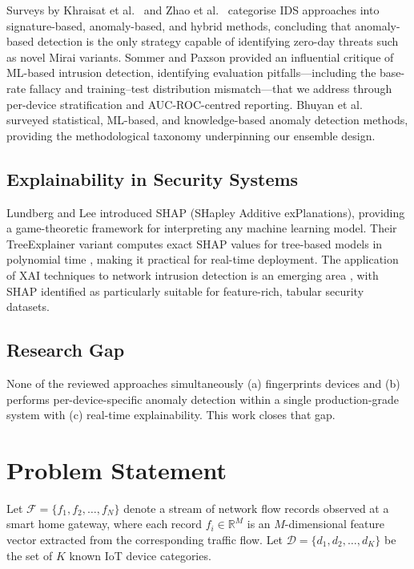 \documentclass[conference]{IEEEtran}
\begin{document}
Surveys by Khraisat et al.\ \cite{khraisat2019survey} and Zhao et al.\
\cite{zhao2021survey} categorise IDS approaches into signature-based,
anomaly-based, and hybrid methods, concluding that anomaly-based detection
is the only strategy capable of identifying zero-day threats such as novel
Mirai variants. Sommer and Paxson \cite{sommer2010outside} provided an
influential critique of ML-based intrusion detection, identifying
evaluation pitfalls---including the base-rate fallacy and
training--test distribution mismatch---that we address through per-device
stratification and AUC-ROC-centred reporting. Bhuyan et al.\
\cite{bhuyan2014network} surveyed statistical, ML-based, and
knowledge-based anomaly detection methods, providing the methodological
taxonomy underpinning our ensemble design.

\subsection{Explainability in Security Systems}

Lundberg and Lee \cite{lundberg2017unified} introduced SHAP (SHapley Additive
exPlanations), providing a game-theoretic framework for interpreting any
machine learning model. Their TreeExplainer variant computes exact SHAP
values for tree-based models in polynomial time \cite{lundberg2020local},
making it practical for real-time deployment. The application of XAI
techniques to network intrusion detection is an emerging area
\cite{ge2023deep}, with SHAP identified as particularly suitable for
feature-rich, tabular security datasets.

\subsection{Research Gap}

None of the reviewed approaches simultaneously (a) fingerprints devices and
(b) performs per-device-specific anomaly detection within a single
production-grade system with (c) real-time explainability. This work closes
that gap.

\section{Problem Statement}
\label{sec:problem}

Let $\mathcal{F} = \{f_1, f_2, \ldots, f_N\}$ denote a stream of network
flow records observed at a smart home gateway, where each record
$f_i \in \mathbb{R}^M$ is an $M$-dimensional feature vector extracted from
the corresponding traffic flow. Let $\mathcal{D} = \{d_1, d_2, \ldots, d_K\}$
be the set of $K$ known IoT device categories.
\end{document}
